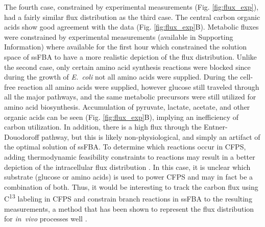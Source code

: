 \documentclass[journal=asbcd6,manuscript=article]{achemso}
\begin{document}
The fourth case, constrained by experimental measurements (Fig. \ref{fig:flux_exp}), had a fairly similar flux distribution as the third case.
The central carbon organic acids show good agreement with the data (Fig. \ref{fig:flux_exp}B).
Metabolic fluxes were constrained by experimental measurements (available in Supporting Information) where available for the first hour which constrained the solution space of ssFBA to have a more realistic depiction of the flux distribution.
Unlike the second case, only certain amino acid synthesis reactions were blocked since during the growth of \emph{E.~coli} not all amino acids were supplied.
During the cell-free reaction all amino acids were supplied, however glucose still traveled through all the major pathways, and the same metabolic precursors were still utilized for amino acid biosynthesis.
Accumulation of pyruvate, lactate, acetate, and other organic acids can be seen (Fig. \ref{fig:flux_exp}B), implying an inefficiency of carbon utilization.
In addition, there is a high flux through the Entner-Douodoroff pathway, but this is likely non-physiological, and simply an artifact of the optimal solution of ssFBA.
To determine which reactions occur in CFPS, adding thermodynamic feasibility constraints to reactions may result in a better depiction of the intracellular flux distribution \cite{Henry:2007,Hamilton:2013}.
In this case, it is unclear which substrate (glucose or amino acids) is used to power CFPS and may in fact be a combination of both.
Thus, it would be interesting to track the carbon flux using C\textsuperscript{13} labeling in CFPS and constrain branch reactions in ssFBA to the resulting measurements, a method that has been shown to represent the flux distribution for \emph{in~vivo} processes well \cite{Zamboni:2009}.
\end{document}
